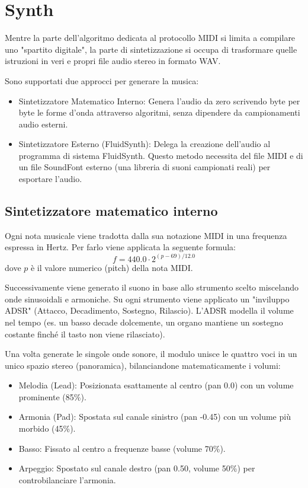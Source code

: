 \section{Synth}
Mentre la parte dell'algoritmo dedicata al protocollo MIDI si limita a compilare uno "spartito digitale", la parte di sintetizzazione si occupa di trasformare quelle istruzioni in veri e propri file audio stereo in formato WAV.


Sono supportati due approcci per generare la musica:
\begin{itemize}
    \item Sintetizzatore Matematico Interno: Genera l'audio da zero scrivendo byte per byte le forme d'onda attraverso algoritmi, senza dipendere da campionamenti audio esterni.
    \item Sintetizzatore Esterno (FluidSynth): Delega la creazione dell'audio al programma di sistema FluidSynth. Questo metodo necessita del file MIDI e di un file SoundFont esterno (una libreria di suoni campionati reali) per esportare l'audio.
\end{itemize}

\subsection{Sintetizzatore matematico interno}
Ogni nota musicale viene tradotta dalla sua notazione MIDI in una frequenza espressa in Hertz.
Per farlo viene applicata la seguente formula:
\[f = 440.0 \cdot 2^{(p-69)/12.0}\]
dove $p$ è il valore numerico (pitch) della nota MIDI.

Successivamente viene generato il suono in base allo strumento scelto miscelando onde sinusoidali e armoniche. Su ogni strumento viene applicato un "inviluppo ADSR" (Attacco, Decadimento, Sostegno, Rilascio). 
L'ADSR modella il volume nel tempo (es. un basso decade dolcemente, un organo mantiene un sostegno costante finché il tasto non viene rilasciato).

Una volta generate le singole onde sonore, il modulo unisce le quattro voci in un unico spazio stereo (panoramica), bilanciandone matematicamente i volumi:
\begin{itemize}
    \item Melodia (Lead): Posizionata esattamente al centro (pan 0.0)
 con un volume prominente (85\%).
    \item  Armonia (Pad): Spostata sul canale sinistro (pan -0.45) con un volume più morbido (45\%).
    \item Basso: Fissato al centro a frequenze basse (volume 70\%).
    \item  Arpeggio: Spostato sul canale destro (pan 0.50, volume 50\%) per controbilanciare l'armonia.
\end{itemize}

